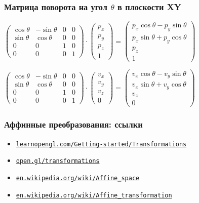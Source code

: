 \documentclass[10pt]{beamer}
\begin{document}
\begin{frame}[fragile]
\frametitle{Матрица поворота на угол \begin{math}\theta\end{math} в плоскости XY}
\begin{center}
\begin{math}
\begin{pmatrix}
\cos \theta & - \sin \theta & 0 & 0 \\
\sin \theta & \cos \theta & 0 & 0 \\
0 & 0 & 1 & 0 \\
0 & 0 & 0 & 1
\end{pmatrix}
\cdot
\begin{pmatrix}
p_x \\
p_y \\
p_z \\
1
\end{pmatrix}
=
\begin{pmatrix}
p_x \cos \theta - p_y \sin \theta \\
p_x \sin \theta + p_y \cos \theta \\
p_z \\
1
\end{pmatrix}
\end{math}

\begin{math}
\begin{pmatrix}
\cos \theta & - \sin \theta & 0 & 0 \\
\sin \theta & \cos \theta & 0 & 0 \\
0 & 0 & 1 & 0 \\
0 & 0 & 0 & 1
\end{pmatrix}
\cdot
\begin{pmatrix}
v_x \\
v_y \\
v_z \\
0
\end{pmatrix}
=
\begin{pmatrix}
v_x \cos \theta - v_y \sin \theta \\
v_x \sin \theta + v_y \cos \theta \\
v_z \\
0
\end{pmatrix}
\end{math}
\end{center}
\end{frame}

\begin{frame}
\frametitle{Аффинные преобразования: ссылки}
\begin{itemize}
\item \href{https://learnopengl.com/Getting-started/Transformations}{\nolinkurl{learnopengl.com/Getting-started/Transformations}}
\item \href{https://open.gl/transformations}{\nolinkurl{open.gl/transformations}}
\item \href{https://en.wikipedia.org/wiki/Affine_space}{\nolinkurl{en.wikipedia.org/wiki/Affine\_space}}
\item \href{https://en.wikipedia.org/wiki/Affine_transformation}{\nolinkurl{en.wikipedia.org/wiki/Affine\_transformation}}
\end{itemize}
\end{frame}
\end{document}
